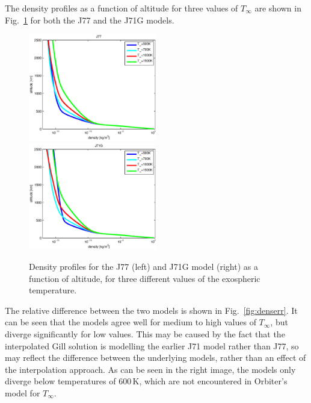 \documentclass[a4paper]{article}
\begin{document}
The density profiles as a function of altitude for three values of $T_\infty$ are shown in Fig.~\ref{fig:dens} for both the J77 and the J71G models.
\begin{figure}
\includegraphics[width=0.5\textwidth]{dens_j77.eps}
\includegraphics[width=0.5\textwidth]{dens_j71g.eps}
\caption{Density profiles for the J77 (left) and J71G model (right) as a function of altitude, for three different values of the exospheric temperature.}
\label{fig:dens}
\end{figure}
The relative difference between the two models is shown in Fig.~\ref{fig:denserr}. It can be seen that the models agree well for medium to high values of $T_\infty$, but diverge significantly for low values. This may be caused by the fact that the interpolated Gill solution is modelling the earlier J71 model rather than J77, so may reflect the difference between the underlying models, rather than an effect of the interpolation approach. As can be seen in the right image, the models only diverge below temperatures of 600\,K, which are not encountered in Orbiter's model for $T_\infty$.
\end{document}
